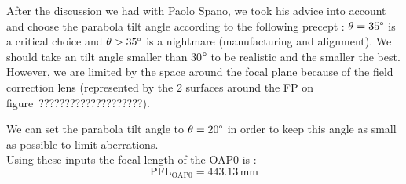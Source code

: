 \documentclass[12pt,a4paper]{article}
\begin{document}
After the discussion we had with Paolo Spano, we took his advice into account and choose the parabola tilt angle according to the following precept : $\theta= 35\degree$ is a critical choice and $\theta > 35\degree$ is a nightmare (manufacturing and alignment). We should take an tilt angle smaller than 30$\degree$ to be realistic and the smaller the best. However, we are limited by the space around the focal plane because of the field correction lens (represented by the 2 surfaces around the FP on figure~????????????????????).


We  can set the parabola tilt angle to $\theta = 20\degree$ in order to keep this angle as small as possible to limit aberrations.\\

Using these inputs the focal length of the OAP0 is :
\begin{equation}
	\text{PFL}_{\text{OAP0}} = 443.13\,\text{mm}	\nonumber
\end{equation}
\end{document}
